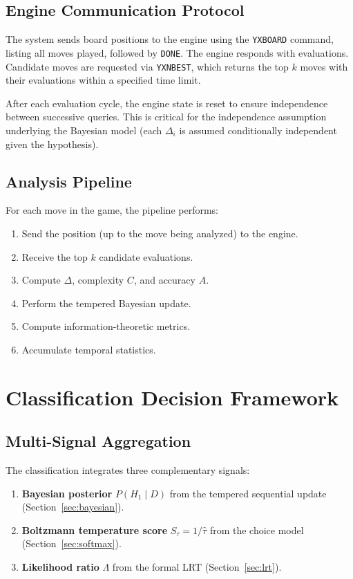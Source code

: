 \documentclass[11pt,a4paper]{article}
\begin{document}
\subsection{Engine Communication Protocol}

The system sends board positions to the engine using the \texttt{YXBOARD}
command, listing all moves played, followed by \texttt{DONE}. The engine
responds with evaluations. Candidate moves are requested via \texttt{YXNBEST},
which returns the top $k$ moves with their evaluations within a specified time
limit.

After each evaluation cycle, the engine state is reset to ensure independence
between successive queries. This is critical for the independence assumption
underlying the Bayesian model (each $\Delta_i$ is assumed conditionally
independent given the hypothesis).

\subsection{Analysis Pipeline}

For each move in the game, the pipeline performs:
\begin{enumerate}
    \item Send the position (up to the move being analyzed) to the engine.
    \item Receive the top $k$ candidate evaluations.
    \item Compute $\Delta$, complexity $C$, and accuracy $A$.
    \item Perform the tempered Bayesian update.
    \item Compute information-theoretic metrics.
    \item Accumulate temporal statistics.
\end{enumerate}


\section{Classification Decision Framework}
\label{sec:classification}

\subsection{Multi-Signal Aggregation}

The classification integrates three complementary signals:
\begin{enumerate}
    \item \textbf{Bayesian posterior} $P(H_1 \mid D)$ from the tempered
          sequential update (Section~\ref{sec:bayesian}).
    \item \textbf{Boltzmann temperature score} $S_{\tau} = 1/\hat{\tau}$
          from the choice model (Section~\ref{sec:softmax}).
    \item \textbf{Likelihood ratio} $\Lambda$ from the formal LRT
          (Section~\ref{sec:lrt}).
\end{enumerate}
\end{document}

